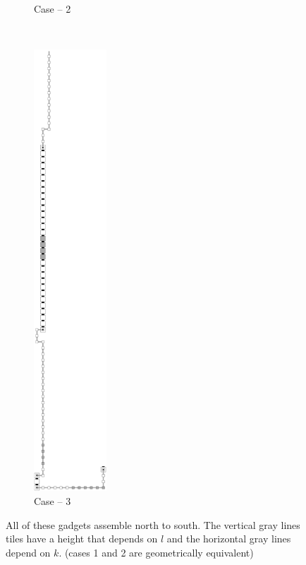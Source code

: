 \begin{figure}[H]
\begin{subfigure}[t]{0.3\textwidth}
                \caption{\label{fig:return_paths/return_digit2_read_next_row} Case -- 2}
            \end{subfigure}%
            ~
            \begin{subfigure}[t]{0.3\textwidth}
                \centering
                \includegraphics[width=0.3\textwidth]{return_paths/return_digit3_read_next_row}
                \caption{\label{fig:return_paths/return_digit3_read_next_row} Case -- 3}
            \end{subfigure}%
            \caption{\label{fig:return_path_next_row}
            All of these gadgets assemble north to south. The vertical gray lines tiles have a height
            that depends on $l$ and the horizontal gray lines depend on $k$. (cases 1 and 2 are geometrically equivalent)}
        \end{figure}



